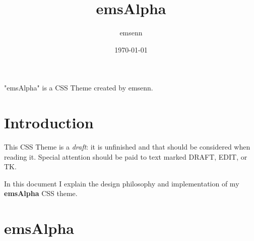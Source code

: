 \documentclass[11pt]{article}
\author{emsenn}
\date{\today}
\title{emsAlpha}
\begin{document}
\maketitle
"emsAlpha" is a CSS Theme created by emsenn.
\setcounter{tocdepth}{4}
\tableofcontents
\section*{Introduction}
\label{sec:org5280800}
This CSS Theme is a \emph{draft}: it is unfinished and that should be considered when reading it. Special attention should be paid to text marked DRAFT, EDIT, or TK.

In this document I explain the design philosophy and implementation of
my \textbf{emsAlpha} CSS theme.
\section*{emsAlpha}
\label{sec:orgc246c66}
\end{document}
